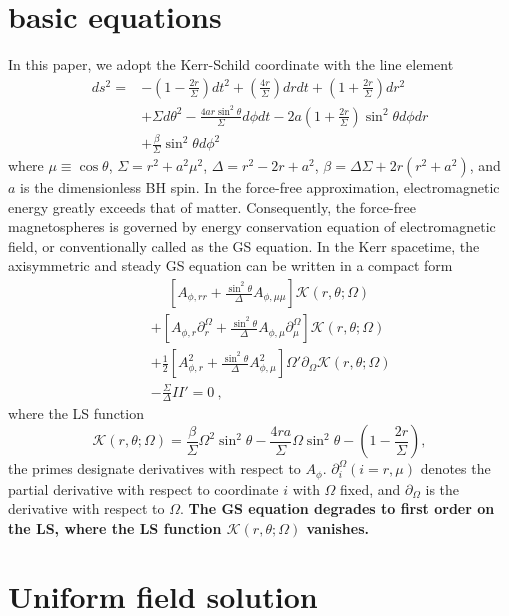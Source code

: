 \documentclass[aps,prd,reprint,nofootinbib, superscriptaddress]{revtex4-1}
\def\nn{\nonumber}
\def\ct{\cos\theta}
\def\sst{\sin^2\theta}
\def\Ar{A_{\phi,r}}
\def\Arr{A_{\phi,rr}}
\def\Am{A_{\phi,\mu}}
\def\Amm{A_{\phi,\mu\mu}}
\def\be{\begin{equation}}
\def\ee{\end{equation}}
\def\ben{\begin{eqnarray}}
\def\een{\end{eqnarray}}
\begin{document}
\section{basic equations}
\label{sec:basic}
In this paper, we adopt the Kerr-Schild
coordinate with the line element
\[
\begin{aligned}
ds^2 =
&-\left( 1-\frac{2r}{\Sigma} \right)dt^2 + \left( \frac{4
r}{\Sigma} \right) dr dt + \left(1+\frac{2r}{\Sigma} \right) dr^2 \\
&+ \Sigma d\theta^2 - \frac{4 a r \sin^2\theta}{\Sigma} d\phi dt
- 2 a \left(1+\frac{2r}{\Sigma}\right) \sin^2\theta d\phi dr     \\
& + \frac{\beta}{\Sigma} \sst d\phi^2
\end{aligned}
\]
where $\mu\equiv\ct$, $\Sigma = r^2 + a^2 \mu^2$, $\Delta = r^2 -2r + a^2$,
$\beta = \Delta\Sigma + 2r(r^2 + a^2)$, and $a$ is the dimensionless BH spin.
In the force-free approximation, electromagnetic energy greatly exceeds that of matter.
Consequently, the force-free magnetospheres is governed by energy
conservation equation of electromagnetic field, or
conventionally called as the GS equation.
In the Kerr spacetime,
the axisymmetric and steady GS equation can be written in a compact form \cite{Pan2017}
\ben
\label{eq:GSg}
&&\phantom{+}
 \left[\Arr + \frac{\sst}{\Delta}\Amm \right]  \mathcal K(r,\theta; \Omega )\nn \\
&&
+\left[\Ar \partial_r^\Omega  +  \frac{\sst}{\Delta}\Am \partial_\mu^\Omega\right] \mathcal K(r,\theta; \Omega ) \nn \\
&&
+ \frac{1}{2}\left[\Ar^2 + \frac{\sst}{\Delta}\Am^2\right]  \Omega' \partial_\Omega \mathcal K(r,\theta; \Omega )\nn \\
&&
- \frac{\Sigma}{\Delta}II' = 0 \ ,
\een
where the LS function
\be
\label{eq:ls}
\mathcal K(r,\theta; \Omega )= \frac{\beta}{\Sigma}\Omega^2 \sst
-\frac{4ra}{\Sigma}\Omega \sst
-\left(1-\frac{2r}{\Sigma}\right),
\ee
the primes designate  derivatives with respect to $A_\phi$.
$\partial_i^\Omega (i=r, \mu)$  denotes the partial derivative
with respect to coordinate $i$ with $\Omega$ fixed, and $\partial_\Omega$ is the derivative with
respect to $\Omega$. {\bf The GS equation degrades to first order on the LS,
where the LS function $\mathcal K(r,\theta; \Omega )$ vanishes.}

\section{Uniform field solution}
\label{sec:uni_sol}
\end{document}
